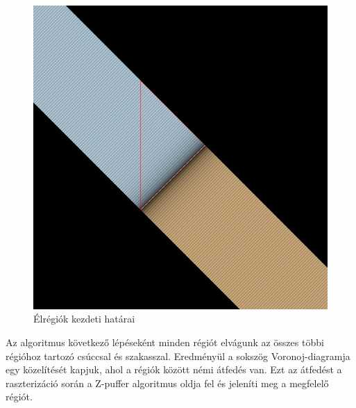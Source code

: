 \begin{figure}[H]
	\centering
	\includegraphics[width=.6\linewidth]{images/initial_segment_regions.png}
	\caption{Élrégiók kezdeti határai}
	\label{fig:initial_segment_regions-1}
\end{figure}

Az algoritmus következő lépéseként minden régiót elvágunk az összes többi régióhoz tartozó csúccsal és szakasszal. Eredményül a sokszög Voronoj-diagramja egy közelítését kapjuk, ahol a régiók között némi átfedés van. Ezt az átfedést a raszterizáció\cite{rasterization} során a Z-puffer\cite{depthtest} algoritmus oldja fel és jeleníti meg a megfelelő régiót.

